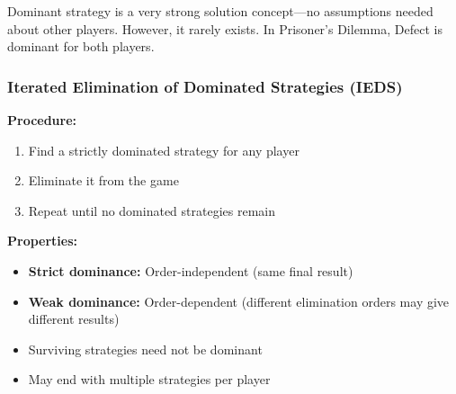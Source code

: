 \begin{tipbox}
Dominant strategy is a very strong solution concept---no assumptions needed about other players. However, it rarely exists. In Prisoner's Dilemma, Defect is dominant for both players.
\end{tipbox}

\separator

\subsubsection{Iterated Elimination of Dominated Strategies (IEDS)}

\begin{thmbox}
\textbf{Procedure:}
\begin{enumerate}
  \item Find a strictly dominated strategy for any player
  \item Eliminate it from the game
  \item Repeat until no dominated strategies remain
\end{enumerate}

\textbf{Properties:}
\begin{itemize}
  \item \textbf{Strict dominance:} Order-independent (same final result)
  \item \textbf{Weak dominance:} Order-dependent (different elimination orders may give different results)
  \item Surviving strategies need not be dominant
  \item May end with multiple strategies per player
\end{itemize}
\end{thmbox}

